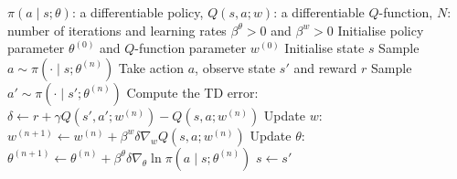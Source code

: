 \begin{algorithm}[htb!]
\caption{Actor-Critic \cite{sutton_reinforcement_2018}.}
\label{Codes:ActorCritic}
\begin{algorithmic}
\REQUIRE $\pi(a \mid s; \theta)$: a differentiable policy, $Q(s, a; w)$: a differentiable $Q$-function, $N$: number of iterations and learning rates $\beta^\theta > 0$ and $\beta^w > 0$
\STATE Initialise policy parameter $\theta^{(0)}$ and $Q$-function parameter $w^{(0)}$
\STATE Initialise state $s$
    \STATE Sample $a \sim \pi(\cdot \mid s; \theta^{(n)})$
    \STATE Take action $a$, observe state $s'$ and reward $r$
    \STATE Sample $a' \sim \pi(\cdot \mid s'; \theta^{(n)})$
    \STATE Compute the TD error: $\delta \gets r + \gamma Q(s', a'; w^{(n)}) - Q(s, a; w^{(n)})$
    \STATE Update $w$: $w^{(n+1)} \gets w^{(n)} + \beta^w \delta \nabla_w Q(s, a; w^{(n)})$
    \STATE Update $\theta$: $\theta^{(n+1)} \gets \theta^{(n)} + \beta^\theta \delta \nabla_\theta \ln \pi(a \mid s; \theta^{(n)})$
    \STATE $s \gets s'$
\ENDFOR
\end{algorithmic}
\end{algorithm}